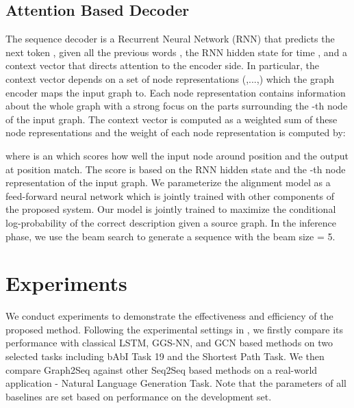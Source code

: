 \documentclass{article} \usepackage{iclr2019_conference,times}
\begin{document}
\subsection{Attention Based Decoder}
The sequence decoder is a Recurrent Neural Network (RNN) that predicts the next token , given all the previous words
, the RNN hidden state  for time , and
a context vector  that directs attention to the encoder side.
In particular, the context vector  depends on a set of node representations (,...,)
which the graph encoder maps the input graph to.
Each node representation  contains information about the whole graph with a strong focus on the parts surrounding the
-th node of the input graph. The context vector  is computed as a weighted sum of these node representations and the weight  of each node representation is computed by:







where  is an   which scores how well the input node around position  and the output at position  match.
The score is based on the RNN hidden state  and the -th node representation of the input graph.
We parameterize the alignment model  as a feed-forward neural network which is jointly trained with other components
of the proposed system.
Our model is jointly trained to maximize the conditional log-probability of the correct description given a source graph.
In the inference phase, we use the beam search to generate a sequence with the beam size = 5.




\section{Experiments}
We conduct experiments to demonstrate the effectiveness and efficiency of the proposed method. Following the experimental settings in  \citep{li2015gated}, we firstly compare its performance with classical LSTM, GGS-NN, and GCN based methods on two selected tasks including bAbI Task 19 and the Shortest Path Task. We then compare Graph2Seq against other Seq2Seq based methods on a real-world application - Natural Language Generation Task. 
Note that the parameters of all baselines are set based on performance on the development set.
\end{document}
